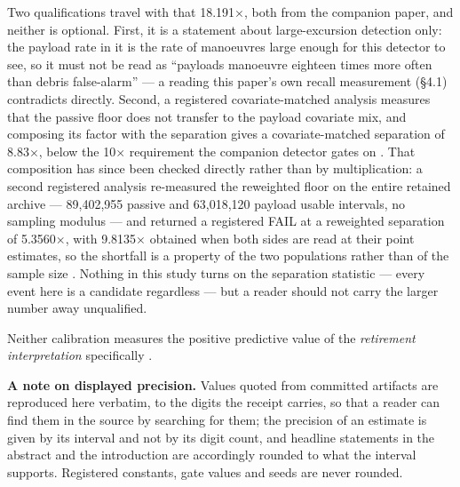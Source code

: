 \documentclass[11pt]{article}
\begin{document}
Two qualifications travel with that 18.191$\times$, both from the companion paper, and neither is optional. First, it is a statement about large-excursion detection only: the payload rate in it is the rate of manoeuvres large enough for this detector to see, so it must not be read as ``payloads manoeuvre eighteen times more often than debris false-alarm'' --- a reading this paper's own recall measurement (\S{}4.1) contradicts directly. Second, a registered covariate-matched analysis measures that the passive floor does not transfer to the payload covariate mix, and composing its factor with the separation gives a covariate-matched separation of 8.83$\times$, below the 10$\times$ requirement the companion detector gates on%
. That composition has since been checked directly rather than by multiplication: a second registered analysis re-measured the reweighted floor on the entire retained archive --- 89,402,955 passive and 63,018,120 payload usable intervals, no sampling modulus --- and returned a registered FAIL at a reweighted separation of 5.3560$\times$, with 9.8135$\times$ obtained when both sides are read at their point estimates, so the shortfall is a property of the two populations rather than of the sample size%
. Nothing in this study turns on the separation statistic --- every event here is a candidate regardless --- but a reader should not carry the larger number away unqualified.

Neither calibration measures the positive predictive value of the \emph{retirement interpretation} specifically%
.

\textbf{A note on displayed precision.} Values quoted from committed artifacts are reproduced here verbatim, to the digits the receipt carries, so that a reader can find them in the source by searching for them; the precision of an estimate is given by its interval and not by its digit count, and headline statements in the abstract and the introduction are accordingly rounded to what the interval supports. Registered constants, gate values and seeds are never rounded.
\end{document}
